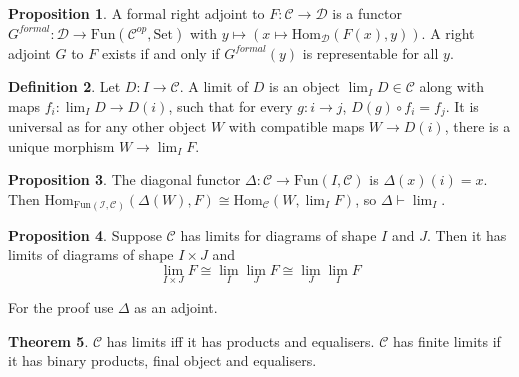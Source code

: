 \documentclass[a4paper,10pt]{article}
\theoremstyle{definition}
\newtheorem{theorem}{Theorem}
\newtheorem{definition}[theorem]{Definition}
\newtheorem{proposition}[theorem]{Proposition}
\newcommand{\Hom}[3][C]{\mathrm{Hom}_\mathcal{#1}(#2, #3)}
\newcommand{\C}{\mathcal{C}}
\newcommand{\D}{\mathcal{D}}
\newcommand{\Set}{\mathrm{Set}}
\begin{document}
\begin{proposition}
    A formal right adjoint to $F \colon \C \rightarrow \D$ is a functor $G^{\mathit{formal}} \colon \mathcal{D} \rightarrow \mathrm{Fun}(\C^{op}, \Set)$ with $y \mapsto (x \mapsto \Hom[D]{F(x)}{y})$. A right adjoint $G$ to $F$ exists if and only if $G^{formal}(y)$ is representable for all $y$.
\end{proposition}

\begin{definition}
    Let $D \colon I \rightarrow \C$. A limit of $D$ is an object $\lim_I D \in \C$ along with maps $f_i \colon \lim_I D \rightarrow D(i)$, such that for every $g \colon i \rightarrow j$, $D(g) \circ f_i = f_j$. It is universal as for any other object $W$ with compatible maps $W \rightarrow D(i)$, there is a unique morphism $W \rightarrow \lim_I F$.
\end{definition}

\begin{proposition}
    The diagonal functor $\Delta \colon \C \rightarrow \mathrm{Fun}(I, \C)$ is  $\Delta(x)(i) = x$. Then $\Hom[\mathrm{Fun}(I, \C)]{\Delta(W)}{F} \cong \Hom{W}{\lim_I F}$, so $\Delta \vdash \lim_I$.
\end{proposition}

\begin{proposition}
    Suppose $\C$ has limits for diagrams of shape $I$ and $J$. Then it has limits of diagrams of shape $I \times J$ and 
    \[
        \lim_{I \times J} F \cong \lim_I \lim_J F \cong \lim_J \lim_I F
    \]
\end{proposition}
For the proof use $\Delta$ as an adjoint.

\begin{theorem}
    $\C$ has limits iff it has products and equalisers. $\C$ has finite limits if it has binary products, final object and equalisers.
\end{theorem}
\end{document}
